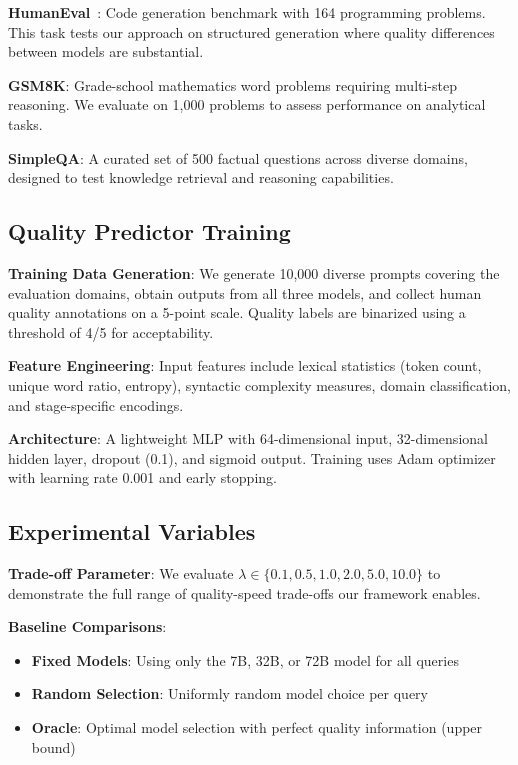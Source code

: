 \documentclass{article}
\theoremstyle{plain}
\theoremstyle{definition}
\theoremstyle{remark}
\begin{document}
\textbf{HumanEval}~\citep{chen2021evaluating}: Code generation benchmark with 164 programming problems. This task tests our approach on structured generation where quality differences between models are substantial.

\textbf{GSM8K}: Grade-school mathematics word problems requiring multi-step reasoning. We evaluate on 1,000 problems to assess performance on analytical tasks.

\textbf{SimpleQA}: A curated set of 500 factual questions across diverse domains, designed to test knowledge retrieval and reasoning capabilities.

\subsection{Quality Predictor Training}

\textbf{Training Data Generation}: We generate 10,000 diverse prompts covering the evaluation domains, obtain outputs from all three models, and collect human quality annotations on a 5-point scale. Quality labels are binarized using a threshold of 4/5 for acceptability.

\textbf{Feature Engineering}: Input features include lexical statistics (token count, unique word ratio, entropy), syntactic complexity measures, domain classification, and stage-specific encodings.

\textbf{Architecture}: A lightweight MLP with 64-dimensional input, 32-dimensional hidden layer, dropout (0.1), and sigmoid output. Training uses Adam optimizer with learning rate 0.001 and early stopping.

\subsection{Experimental Variables}

\textbf{Trade-off Parameter}: We evaluate $\lambda \in \{0.1, 0.5, 1.0, 2.0, 5.0, 10.0\}$ to demonstrate the full range of quality-speed trade-offs our framework enables.

\textbf{Baseline Comparisons}: 
\begin{itemize}
\item \textbf{Fixed Models}: Using only the 7B, 32B, or 72B model for all queries
\item \textbf{Random Selection}: Uniformly random model choice per query
\item \textbf{Oracle}: Optimal model selection with perfect quality information (upper bound)
\end{itemize}
\end{document}

